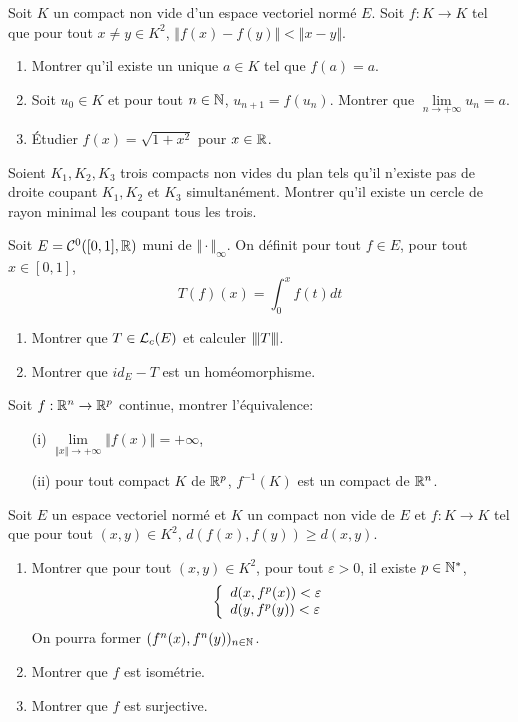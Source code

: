 \documentclass[12pt]{article}
\begin{document}
\begin{exercise}
	Soit $K$ un compact non vide d'un espace vectoriel normé $E$. Soit $f\colon K\to K$ tel que pour tout $x\neq y\in K^{2}$, $\Vert f(x)-f(y)\Vert<\Vert x-y\Vert$.
	\begin{enumerate}
		\item Montrer qu'il existe un unique $a\in K$ tel que $f(a)=a$.
		\item Soit $u_{0}\in K$ et pour tout $n\in\mathbb{N}$, $u_{n+1}=f(u_{n})$. Montrer que $\lim\limits_{n\to+\infty}u_{n}=a$.
		\item Étudier $f(x)=\sqrt{1+x^{2}}$ pour $x\in\mathbb{R}$.
	\end{enumerate}
\end{exercise}

\begin{exercise}
	Soient $K_{1},K_{2},K_{3}$ trois compacts non vides du plan tels qu'il n'existe pas de droite coupant $K_{1},K_{2}$ et $K_{3}$ simultanément. Montrer qu'il existe un cercle de rayon minimal les coupant tous les trois.
\end{exercise}

\begin{exercise}
	Soit $E=\mathcal{C}^{0}([0,1],\mathbb{R})$ muni de $\Vert\cdot\Vert_{\infty}$. On définit pour tout $f\in E$, pour tout $x\in[0,1]$, 
	$$T(f)(x)=\int_{0}^{x}f(t)dt$$
	\begin{enumerate}
		\item Montrer que $T\in\mathcal{L}_{c}(E)$ et calculer ${\left\vert\kern-0.25ex\left\vert\kern-0.25ex\left\vert{}T \right\vert\kern-0.25ex\right\vert\kern-0.25ex\right\vert}$.
		\item Montrer que $id_{E}-T$ est un homéomorphisme.
	\end{enumerate}
\end{exercise}

\begin{exercise}
	Soit $f:\mathbb{R}^{n}\to\mathbb{R}^{p}$ continue, montrer l'équivalence:
	\begin{enumerate}
		\item [(i)] $\lim\limits_{\Vert x\Vert\to+\infty}\Vert f(x)\Vert=+\infty$,
		\item [(ii)] pour tout compact $K$ de $\mathbb{R}^{p}$, $f^{-1}(K)$ est un compact de $\mathbb{R}^{n}$.
	\end{enumerate}
\end{exercise}

\begin{exercise}
	Soit $E$ un espace vectoriel normé et $K$ un compact non vide de $E$ et $f:K\to K$ tel que pour tout $(x,y)\in K^{2}$, $d(f(x),f(y))\geqslant d(x,y)$.
	\begin{enumerate}
		\item Montrer que pour tout $(x,y)\in K^{2}$, pour tout $\varepsilon>0$, il existe $p\in\mathbb{N}^{*}$,
		$$
		\left\{
			\begin{array}[]{l}
				d(x,f^{p}(x))<\varepsilon\\
				d(y,f^{p}(y))<\varepsilon
			\end{array}
		\right.
		$$
		On pourra former $(f^{n}(x),f^{n}(y))_{n\in\mathbb{N}}$.
		\item Montrer que $f$ est isométrie.
		\item Montrer que $f$ est surjective.
	\end{enumerate}
\end{exercise}
\end{document}

